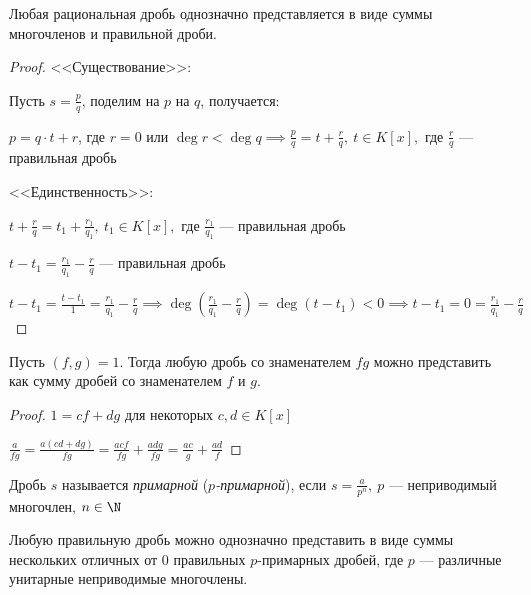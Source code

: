 \begin{lemma}
    Любая рациональная дробь однозначно представляется в виде суммы многочленов и правильной дроби.
\end{lemma}

\begin{proof}

    <<Существование>>:

    Пусть $s = \frac{p}{q}$, поделим на $p$ на $q$, получается:

    $p = q \cdot t + r$, где $r = 0$ или $\deg r < \deg q \implies \frac{p}{q} = t + \frac{r}{q},~t \in K[x],$ где $\frac{r}{q}$ --- правильная дробь

    <<Единственность>>:

    $t + \frac{r}{q} = t_1 + \frac{r_1}{q_1},~ t_1 \in K[x],$ где $\frac{r_1}{q_1}$ --- правильная дробь

    $t - t_1 = \frac{r_1}{q_1} - \frac{r}{q}$ --- правильная дробь

    $t - t_1 = \frac{t - t_1}{1} = \frac{r_1}{q_1} - \frac{r}{q} \implies \deg(\frac{r_1}{q_1} - \frac{r}{q}) = \deg(t - t_1) < 0 \implies  t - t_1 = 0 = \frac{r_1}{q_1} - \frac{r}{q}$
\end{proof}

\begin{lemma}
    Пусть $(f, g) = 1$. Тогда любую дробь со знаменателем $fg$ можно представить как сумму дробей со знаменателем $f$ и $g$.
\end{lemma}

\begin{proof}
    $1 = cf + dg$ для некоторых $c, d \in K[x]$

    $\frac{a}{fg} = \frac{a(cd + dg)}{fg} = \frac{acf}{fg} + \frac{adg}{fg} = \frac{ac}{g} + \frac{ad}{f}$
\end{proof}

\begin{defn}
    Дробь $s$ называется \emph{примарной} (\emph{$p$-примарной}), если $s = \frac{a}{p^n},~ p$ --- неприводимый многочлен, $n \in \N$
\end{defn}

\begin{theorem-non}
    Любую правильную дробь можно однозначно представить в виде суммы нескольких отличных от $0$ правильных $p$-примарных дробей, где $p$ --- различные унитарные неприводимые многочлены.
\end{theorem-non}

